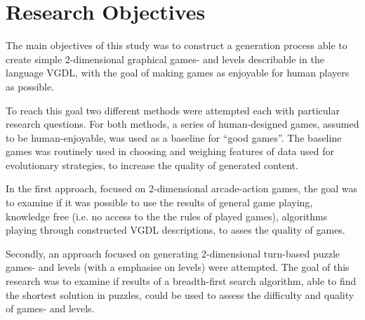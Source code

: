 \documentclass[a4paper,titlepage,final]{report}
\begin{document}
\section{Research Objectives}
\label{sec_researchobj}
The main objectives of this study was to construct a generation process able to create simple 2-dimensional graphical games- and levels describable in the language VGDL, with the goal of making games as enjoyable for human players as possible.

To reach this goal two different methods were attempted each with particular research questions.
For both methods, a series of human-designed games, assumed to be human-enjoyable, was used as a baseline for ``good games''.
The baseline games was routinely used in choosing and weighing features of data used for evolutionary strategies, to increase the quality of generated content.

In the first approach, focused on 2-dimensional arcade-action games, the goal was to examine if it was possible to use the results of general game playing, knowledge free (i.e. no access to the the rules of played games), algorithms playing through constructed VGDL descriptions, to asses the quality of games.

Secondly, an approach focused on generating 2-dimensional turn-based puzzle games- and levels (with a emphasise on levels) were attempted.
The goal of this research was to examine if results of a breadth-first search algorithm, able to find the shortest solution in puzzles, could be used to assess the difficulty and quality of games- and levels.





\end{document}
